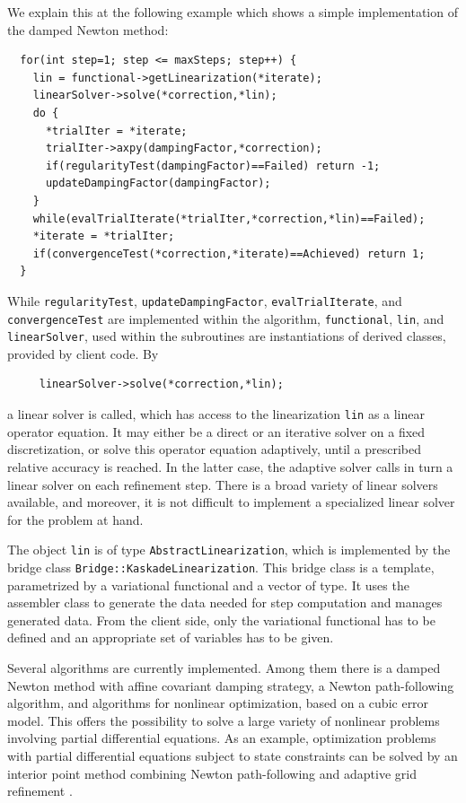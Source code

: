 \documentclass[11pt]{article}
\begin{document}
We explain this at the following example which shows a simple implementation of the damped Newton method:

\begin{lstlisting}
  for(int step=1; step <= maxSteps; step++) {
    lin = functional->getLinearization(*iterate);
    linearSolver->solve(*correction,*lin);
    do {
      *trialIter = *iterate;
      trialIter->axpy(dampingFactor,*correction);
      if(regularityTest(dampingFactor)==Failed) return -1;
      updateDampingFactor(dampingFactor);
    } 
    while(evalTrialIterate(*trialIter,*correction,*lin)==Failed);
    *iterate = *trialIter;
    if(convergenceTest(*correction,*iterate)==Achieved) return 1;
  }
\end{lstlisting}

\noindent While {\tt regularityTest}, {\tt updateDampingFactor}, {\tt evalTrialIterate}, and {\tt convergenceTest} are
implemented within the algorithm, {\tt functional}, {\tt lin}, and {\tt linearSolver}, used within the 
subroutines are instantiations of derived classes, provided by client code. By

\begin{lstlisting}
     linearSolver->solve(*correction,*lin);
\end{lstlisting}

\noindent a linear solver is called, which has access to the linearization {\tt lin} as a linear operator equation. 
It may either be a direct or an iterative solver on a fixed discretization, or solve this operator equation adaptively, until
a prescribed relative accuracy is reached. In the latter case, the adaptive solver calls in turn a linear solver 
on each refinement step. There is a broad variety of linear solvers available, and moreover, 
it is not difficult to implement a
specialized linear solver for the problem at hand. 

The object \verb?lin? is of type {\tt AbstractLinearization}, which is implemented by the bridge 
class {\tt Bridge::KaskadeLinearization}. This bridge class is a template, parametrized by a variational functional and a 
vector of type. It uses the assembler class to generate the data needed for step 
computation and manages generated data. From the client side, only the variational functional has to be defined and an 
appropriate set of variables has to be given. 

Several algorithms are currently implemented. Among them there is a damped Newton method \cite{DdBook2006} with affine 
covariant damping strategy, a Newton path-following algorithm, and algorithms for nonlinear optimization, based on a 
cubic error model. This offers the possibility to solve a large variety of nonlinear problems involving partial differential 
equations.
As an example, optimization problems with partial differential equations subject to state constraints can be solved
by an interior point method combining Newton path-following and adaptive grid refinement \cite{SchGue2009}.
\end{document}

